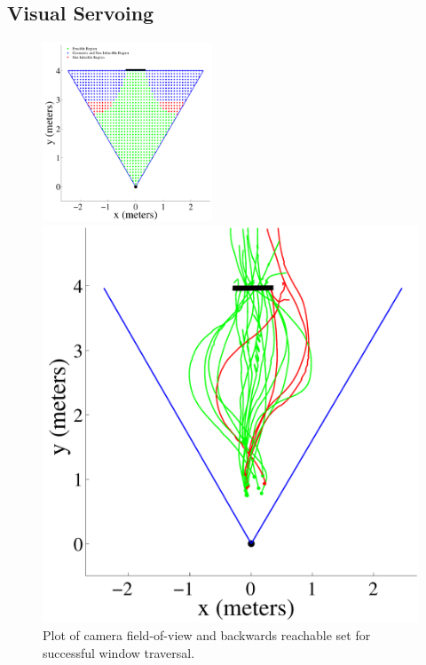 \documentclass{aamas2013}
\begin{document}
\subsection{Visual Servoing}
\label{sec:visual_servoing}

\begin{figure}[tb]

\begin{minipage}{\linewidth}
\centering
\includegraphics[width=0.45\textwidth]{figures/feasible_set.pdf}
\caption{Plot of camera field-of-view and backwards reachable set for successful window traversal.}
\label{fig:feasible_set}
\end{minipage}
\vspace{1em}
\begin{minipage}[b]{0.45\linewidth}
\centering
\includegraphics[width=\textwidth]{figures/flight_paths_feasible.pdf}

\end{minipage}
\end{figure}
\end{document}
